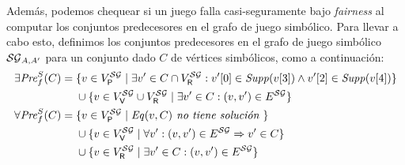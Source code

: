 
Además, podemos chequear si un juego falla casi-seguramente bajo \emph{fairness} al computar los conjuntos predecesores en el grafo de juego simbólico. Para llevar a cabo esto, definimos los conjuntos predecesores en el grafo de juego simbólico $\SymbG_{A,A'}$ para un conjunto dado $C$ de vértices simbólicos, como a continuación:
%
{\small
\begin{align*}
	\SymbEFairpre(C) ={}& \{ v \in V^\SymbG_\Probabilistic \mid  \exists v' \in C\cap V^\SymbG_\Refuter : \pr{0}{v'}\in\support{\pr{3}{v}} \land \pr{2}{v'}\in\support{\pr{4}{v}} \} \\
		       & \cup \{ v \in  V^\SymbG_\Verifier \cup V^\SymbG_\Refuter  \mid \exists v' \in C : (v,v') \in E^\SymbG \}\\
	\SymbAFairpre(C) = {}&\{ v \in V^\SymbG_\Probabilistic \mid \Eq(v,C) \textit{  no tiene solución }\} \\
		      & \cup \{ v \in  V^\SymbG_\Verifier   \mid \forall v' : (v,v') \in E^\SymbG \Rightarrow v' \in C \}\\
		      &  \cup \{ v \in  V^\SymbG_\Refuter  \mid \exists v' \in C : (v,v') \in E^\SymbG \}
\end{align*}}%
